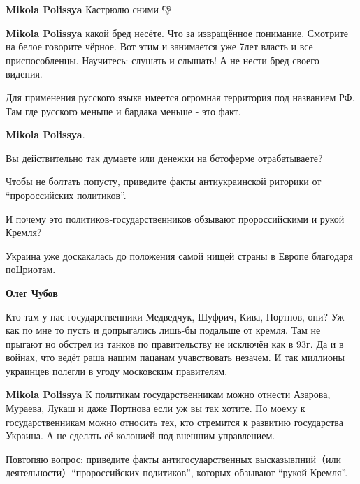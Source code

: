 \begin{itemize}
\begin{itemize}
\textbf{Mikola Polissya} Кастрюлю сними 👎

\textbf{Mikola Polissya} какой бред несёте. Что за извращённое
понимание. Смотрите на белое говорите чёрное. Вот этим и занимается уже 7лет
власть и все приспособленцы. Научитесь: слушать и слышать! А не нести бред
своего видения.

Для применения русского языка имеется огромная территория под названием РФ. Там
где русского меньше и бардака меньше - это факт.


\textbf{Mikola Polissya}.

Вы действительно так думаете или денежки на ботоферме отрабатываете?

Чтобы не болтать попусту, приведите факты антиукраинской риторики от \enquote{пророссийских политиков}.

И почему это политиков-государственников обзывают пророссийскими и рукой
Кремля?

Украина уже доскакалась до положения самой нищей страны в Европе благодаря
поЦриотам.


\textbf{Олег Чубов} 

Кто там у нас
государственники-Медведчук, Шуфрич, Кива, Портнов,  они? Уж как по мне то пусть и
допрыгались лишь-бы подальше от кремля. Там не прыгают но обстрел из танков по
правительству не исключён как в 93г. Да и в войнах, что ведёт раша нашим
пацанам учавствовать незачем. И так миллионы украинцев полегли в угоду
московским правителям.


\textbf{Mikola Polissya} К политикам государственникам можно отнести Азарова,
Мураева, Лукаш и даже Портнова если уж вы так хотите. По моему к
государственникам можно относить тех, кто стремится к развитию государства
Украина. А не сделать её колонией под внешним управлением.

Повтопяю вопрос: приведите факты антигосударственных высказывпний（или
деятельности）\enquote{пророссийских подитиков}, которых обзывают \enquote{рукой Кремля}.


\end{itemize}
\end{itemize}
